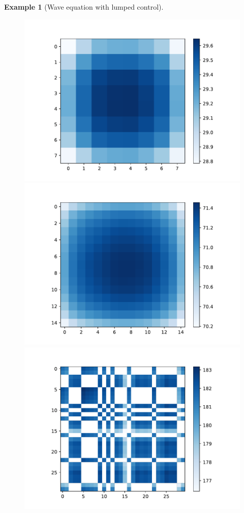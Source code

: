\documentclass[journal,twoside,web]{ieeecolor}
\newtheorem{example}{Example}
\begin{document}
\begin{example}[Wave equation with lumped control]
	\begin{figure}	
	\includegraphics[scale=0.225]{figures/heat_mat-8d}
	\hspace{0.1cm}
	\includegraphics[scale=0.225]{figures/heat_mat-15d}
	\hspace{0.1cm}
	\includegraphics[scale=0.225]{figures/heat_mat-30d}
	\vspace{0.1cm}
	

\end{figure}
\end{example}
\end{document}
